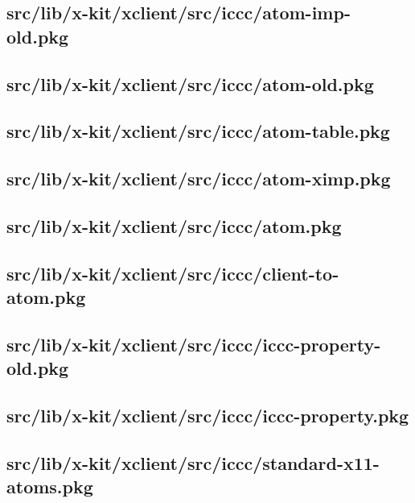 \subsection{src/lib/x-kit/xclient/src/iccc/atom-imp-old.pkg}


\subsection{src/lib/x-kit/xclient/src/iccc/atom-old.pkg}


\subsection{src/lib/x-kit/xclient/src/iccc/atom-table.pkg}


\subsection{src/lib/x-kit/xclient/src/iccc/atom-ximp.pkg}


\subsection{src/lib/x-kit/xclient/src/iccc/atom.pkg}


\subsection{src/lib/x-kit/xclient/src/iccc/client-to-atom.pkg}


\subsection{src/lib/x-kit/xclient/src/iccc/iccc-property-old.pkg}


\subsection{src/lib/x-kit/xclient/src/iccc/iccc-property.pkg}


\subsection{src/lib/x-kit/xclient/src/iccc/standard-x11-atoms.pkg}


